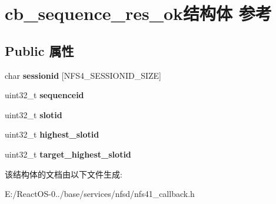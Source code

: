 \hypertarget{structcb__sequence__res__ok}{}\section{cb\+\_\+sequence\+\_\+res\+\_\+ok结构体 参考}
\label{structcb__sequence__res__ok}
\subsection*{Public 属性}
\begin{DoxyCompactItemize}
\item 
\mbox{\label{structcb__sequence__res__ok_a7a11057f5e6f8c03600a1a77e36d8a59}} 
char {\bfseries sessionid} \mbox{[}N\+F\+S4\+\_\+\+S\+E\+S\+S\+I\+O\+N\+I\+D\+\_\+\+S\+I\+ZE\mbox{]}
\item 
\mbox{\label{structcb__sequence__res__ok_adbae7c3e0a87e02d67f41be91129710e}} 
uint32\+\_\+t {\bfseries sequenceid}
\item 
\mbox{\label{structcb__sequence__res__ok_a2b96601cf7d9022d0452639c4f7cb2fe}} 
uint32\+\_\+t {\bfseries slotid}
\item 
\mbox{\label{structcb__sequence__res__ok_ad749db5635c7006e813fedb8a09f743a}} 
uint32\+\_\+t {\bfseries highest\+\_\+slotid}
\item 
\mbox{\label{structcb__sequence__res__ok_a4adb43e2d3d6d7ad1800dd25b016dd21}} 
uint32\+\_\+t {\bfseries target\+\_\+highest\+\_\+slotid}
\end{DoxyCompactItemize}


该结构体的文档由以下文件生成\+:\begin{DoxyCompactItemize}
\item 
E\+:/\+React\+O\+S-\/0../base/services/nfsd/nfs41\+\_\+callback.\+h\end{DoxyCompactItemize}
